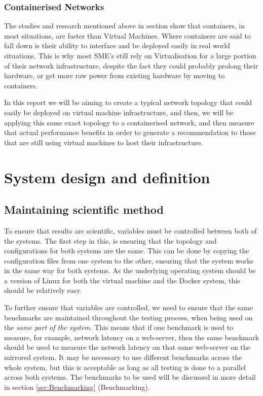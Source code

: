 \subsection{Containerised Networks}
The studies and research mentioned above in section \label{ComparisonStudies} show that containers, in most situations, are faster than Virtual Machines. Where containers are said to fall down is their ability to interface and be deployed easily in real world situations. This is why most SME's still rely on Virtualisation for a large portion of their network infrastructure, despite the fact they could probably prolong their hardware, or get more raw power from existing hardware by moving to containers.

In this report we will be aiming to create a typical network topology that could easily be deployed on virtual machine infrastructure, and then, we will be applying this same exact topology to a containerised network, and then measure that actual performance benefits in order to generate a recommendation to those that are still using virtual machines to host their infrastructure.

\chapter{System design and definition}
\label{SystemDesignDefinition}

\section{Maintaining scientific method}
To ensure that results are scientific, variables must be controlled between both of the systems. The first step in this, is ensuring that the topology and configurations for both systems are the same. This can be done by copying the configuration files from one system to the other, ensuring that the system works in the same way for both systems. As the underlying operating system should be a version of Linux for both the virtual machine and the Docker system, this should be relatively easy.

To further ensure that variables are controlled, we need to ensure that the same benchmarks are maintained throughout the testing process, when being used on the \emph{same part of the system}. This means that if one benchmark is used to measure, for example, network latency on a web-server, then the same benchmark should be used to measure the network latency on that same web-server on the mirrored system. It may be necessary to use different benchmarks across the whole system, but this is acceptable as long as all testing is done to a parallel across both systems. The benchmarks to be used will be discussed in more detail in section \ref{sec:Benchmarking} (Benchmarking).


